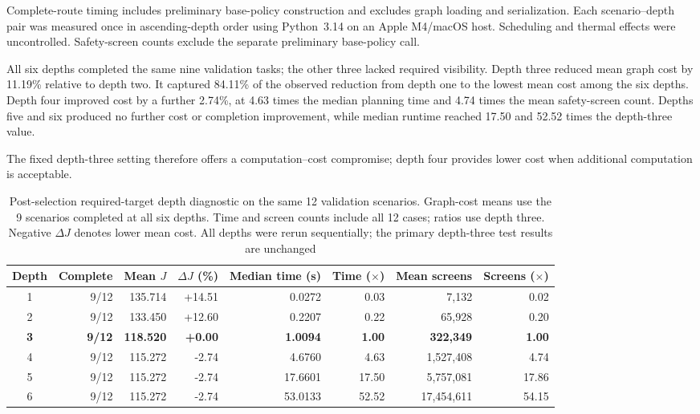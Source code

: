 \documentclass{IEEEtaes}
\theoremstyle{remark}
\theoremstyle{plain}
\begin{document}
Complete-route timing includes preliminary base-policy construction and excludes graph loading and serialization. Each scenario--depth pair was measured once in ascending-depth order using Python~3.14 on an Apple M4/macOS host. Scheduling and thermal effects were uncontrolled. Safety-screen counts exclude the separate preliminary base-policy call.

All six depths completed the same nine validation tasks; the other three lacked required visibility. Depth three reduced mean graph cost by 11.19\% relative to depth two. It captured 84.11\% of the observed reduction from depth one to the lowest mean cost among the six depths. Depth four improved cost by a further 2.74\%, at 4.63 times the median planning time and 4.74 times the mean safety-screen count. Depths five and six produced no further cost or completion improvement, while median runtime reached 17.50 and 52.52 times the depth-three value.

The fixed depth-three setting therefore offers a computation--cost compromise; depth four provides lower cost when additional computation is acceptable.

\begin{table}[t]
  \centering
  \caption{Post-selection required-target depth diagnostic on the same 12 validation scenarios. Graph-cost means use the 9 scenarios completed at all six depths. Time and screen counts include all 12 cases; ratios use depth three. Negative $\Delta J$ denotes lower mean cost. All depths were rerun sequentially; the primary depth-three test results are unchanged}
  \label{tab:depth-sensitivity}
  \renewcommand{\arraystretch}{1.08}
  \setlength{\tabcolsep}{5pt}
  \footnotesize
  \begin{tabular*}{\linewidth}{@{\extracolsep{\fill}}crrrrrrr@{}}
    \toprule
    Depth & Complete & Mean $J$ & $\Delta J$ (\%) & Median time (s) & Time ($\times$) & Mean screens & Screens ($\times$) \\
    \midrule
    1 & 9/12 & 135.714 & +14.51 & 0.0272 & 0.03 & 7,132 & 0.02 \\
    2 & 9/12 & 133.450 & +12.60 & 0.2207 & 0.22 & 65,928 & 0.20 \\
    \textbf{3} & \textbf{9/12} & \textbf{118.520} & \textbf{+0.00} & \textbf{1.0094} & \textbf{1.00} & \textbf{322,349} & \textbf{1.00} \\
    4 & 9/12 & 115.272 & -2.74 & 4.6760 & 4.63 & 1,527,408 & 4.74 \\
    5 & 9/12 & 115.272 & -2.74 & 17.6601 & 17.50 & 5,757,081 & 17.86 \\
    6 & 9/12 & 115.272 & -2.74 & 53.0133 & 52.52 & 17,454,611 & 54.15 \\
    \bottomrule
  \end{tabular*}
\end{table}
\end{document}
